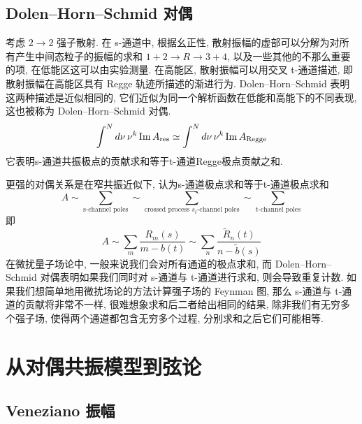 \documentclass[10pt]{article}
\newcounter{ex}[section]\setcounter{ex}{0}
\numberwithin{equation}{section}
\begin{document}
\subsection{Dolen–Horn–Schmid 对偶}
考虑 $2\to2$ 强子散射. 在 s-通道中, 根据幺正性, 散射振幅的虚部可以分解为对所有产生中间态粒子的振幅的求和 $1+2\longrightarrow R\longrightarrow 3+4$, 以及一些其他的不那么重要的项, 在低能区这可以由实验测量. 在高能区, 散射振幅可以用交叉 t-通道描述, 即散射振幅在高能区具有 Regge 轨迹所描述的渐进行为. Dolen–Horn–Schmid 表明这两种描述是近似相同的, 它们近似为同一个解析函数在低能和高能下的不同表现, 这也被称为 Dolen–Horn–Schmid 对偶.
\begin{equation}
  \int^{N}d\nu\,\nu^k\operatorname{Im}A_{\rm res}\simeq\int^{N}d\nu\,\nu^k\operatorname{Im}A_{\rm Regge}
\end{equation}
它表明s-通道共振极点的贡献求和等于t-通道Regge极点贡献之和.

更强的对偶关系是在窄共振近似下, 认为s-通道极点求和等于t-通道极点求和
\begin{equation}
A\sim \sum_{\text{s-channel poles}}\sim \sum_{\text{crossed process }s_{t}\text{-channel poles}}\sim \sum_{\text{t-channel poles}}
\end{equation}
即
\begin{equation}
A\sim \sum_{m} \frac{R_{m}(s)}{m-b(t)}\sim \sum_{n} \frac{\tilde{R}_{n}(t)}{n-\tilde{b}(s)}
\end{equation}
在微扰量子场论中, 一般来说我们会对所有通道的极点求和, 而 Dolen–Horn–Schmid 对偶表明如果我们同时对 s-通道与 t-通道进行求和, 则会导致重复计数. 如果我们想简单地用微扰场论的方法计算强子场的 Feynman 图, 那么 s-通道与 t-通道的贡献将非常不一样, 很难想象求和后二者给出相同的结果, 除非我们有无穷多个强子场, 使得两个通道都包含无穷多个过程, 分别求和之后它们可能相等\cite{DolenHornSchmid1967,DolenHornSchmid1968}. 

\section{从对偶共振模型到弦论}

\subsection{Veneziano 振幅}
\end{document}
